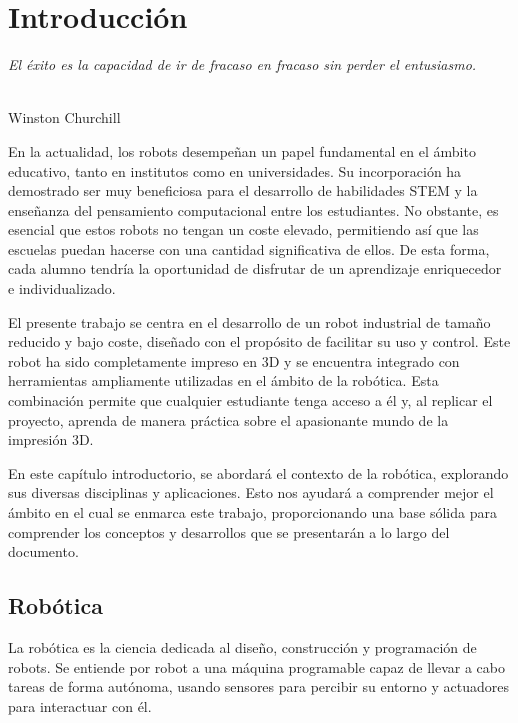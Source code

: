 \chapter{Introducción}
\label{cap:capitulo1}
\setcounter{page}{1}

\begin{flushright}
\begin{minipage}[]{10cm}
\emph{El éxito es la capacidad de ir de fracaso en fracaso sin perder el entusiasmo.}\\
\end{minipage}\\

Winston Churchill\\
\end{flushright}

\noindent En la actualidad, los robots desempeñan un papel fundamental en el ámbito educativo, tanto en institutos como en universidades. Su 
incorporación ha demostrado ser muy beneficiosa para el desarrollo de habilidades \acs{STEM} y la enseñanza del pensamiento computacional 
entre los estudiantes. No obstante, es esencial que estos robots no tengan un coste elevado, permitiendo así que las escuelas puedan hacerse 
con una cantidad significativa de ellos. De esta forma, cada alumno tendría la oportunidad de disfrutar de un aprendizaje enriquecedor e individualizado.

El presente trabajo se centra en el desarrollo de un robot industrial de tamaño reducido y bajo coste, diseñado con el propósito de 
facilitar su uso y control. Este robot ha sido completamente impreso en 3D y se encuentra integrado con herramientas ampliamente 
utilizadas en el ámbito de la robótica. Esta combinación permite que cualquier estudiante tenga acceso a él y, al replicar el proyecto, 
aprenda de manera práctica sobre el apasionante mundo de la impresión 3D.

En este capítulo introductorio, se abordará el contexto de la robótica, explorando sus diversas disciplinas y aplicaciones. Esto nos ayudará a 
comprender mejor el ámbito en el cual se enmarca este trabajo, proporcionando una base sólida para comprender los conceptos y desarrollos que 
se presentarán a lo largo del documento.


\section{Robótica}
\label{sec:rob}
\noindent La robótica es la ciencia dedicada al diseño, construcción y programación de robots. Se entiende por 
robot a una máquina programable capaz de llevar a cabo tareas de forma autónoma, usando sensores para percibir su entorno y 
actuadores para interactuar con él.

